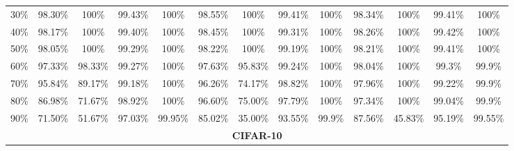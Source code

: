 \begin{table}
{\begin{tabular}{|c|cc|cc|cc|cc|cc|cc|}
30\%                       & 98.30\%                   & 100\%                          & 99.43\%                   & 100\%   & 98.55\%                   & 100\%                          & 99.41\%                   & 100\%   & 98.34\%                   & 100\%                          & 99.41\%                   & 100\%   \\
40\%                       & 98.17\%                   & 100\%                          & 99.40\%                   & 100\%   & 98.45\%                   & 100\%                          & 99.31\%                   & 100\%   & 98.26\%                   & 100\%                          & 99.42\%                   & 100\%   \\
50\%                       & 98.05\%                   & 100\%                          & 99.29\%                   & 100\%   & 98.22\%                   & 100\%                          & 99.19\%                   & 100\%   & 98.21\%                   & 100\%                          & 99.41\%                   & 100\%   \\
60\%                       & 97.33\%                   & {\color[HTML]{CB0000} 98.33\%} & 99.27\%                   & 100\%   & 97.63\%                   & {\color[HTML]{CB0000} 95.83\%} & 99.24\%                   & 100\%   & 98.04\%                   & {\color[HTML]{036400} 100\%}   & 99.3\%                    & 99.9\%  \\
70\%                       & 95.84\%                   & {\color[HTML]{CB0000} 89.17\%} & 99.18\%                   & 100\%   & 96.26\%                   & {\color[HTML]{CB0000} 74.17\%} & 98.82\%                   & 100\%   & 97.96\%                   & {\color[HTML]{036400} 100\%}   & 99.22\%                   & 99.9\%  \\
80\%                       & 86.98\%                   & {\color[HTML]{CB0000} 71.67\%} & 98.92\%                   & 100\%   & 96.60\%                   & {\color[HTML]{CB0000} 75.00\%} & 97.79\%                   & 100\%   & 97.34\%                   & {\color[HTML]{036400} 100\%}   & 99.04\%                   & 99.9\%  \\
90\%                       & 71.50\%                   & {\color[HTML]{CB0000} 51.67\%} & 97.03\%                   & 99.95\% & 85.02\%                   & {\color[HTML]{CB0000} 35.00\%} & 93.55\%                   & 99.9\%  & 87.56\%                   & {\color[HTML]{CB0000} 45.83\%} & 95.19\%                   & 99.55\% \\ \hline
\multicolumn{13}{|c|}{\textbf{CIFAR-10}}                                                                                                                                                                                                                                                                                            \\ \hline

\end{tabular}}
\end{table}

